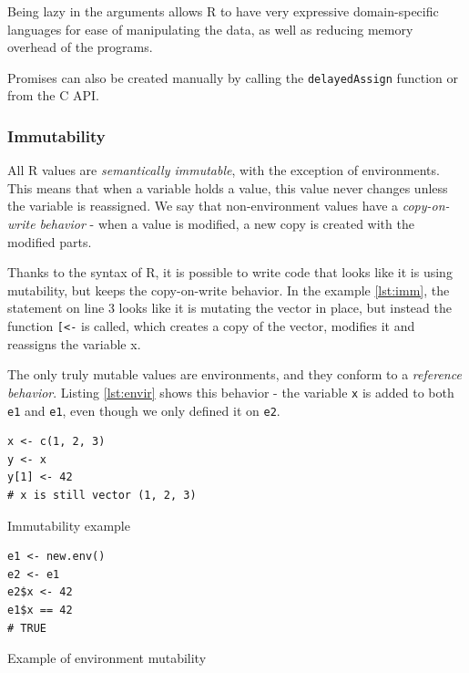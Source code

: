 Being lazy in the arguments allows R to have very expressive domain-specific languages for ease of manipulating the data, as well as reducing memory overhead of the programs.

Promises can also be created manually by calling the \texttt{delayedAssign} function or from the C API.

\subsubsection*{Immutability}

All R values are \textit{semantically immutable}, with the exception of environments. This means that when a variable holds a value, this value never changes unless the variable is reassigned. We say that non-environment values have a \textit{copy-on-write behavior} - when a value is modified, a new copy is created with the modified parts.

Thanks to the syntax of R, it is possible to write code that looks like it is using mutability, but keeps the copy-on-write behavior. In the example \ref{lst:imm}, the statement on line 3 looks like it is mutating the vector in place, but instead the function \texttt{[<-} is called, which creates a copy of the vector, modifies it and reassigns the variable x.

The only truly mutable values are environments, and they conform to a \textit{reference behavior}. Listing \ref{lst:envir} shows this behavior - the variable \texttt{x} is added to both \texttt{e1} and \texttt{e1}, even though we only defined it on \texttt{e2}.

\begin{listing}
	\centering
	\begin{minipage}{0.47\textwidth}
		\begin{verbatim}
x <- c(1, 2, 3)
y <- x
y[1] <- 42
# x is still vector (1, 2, 3)
      \end{verbatim}
		\caption{Immutability example}\label{lst:imm}
	\end{minipage}
	\hfill
	\begin{minipage}{0.47\textwidth}
		\begin{verbatim}
e1 <- new.env()
e2 <- e1
e2$x <- 42
e1$x == 42
# TRUE
      \end{verbatim}
		\caption{Example of environment mutability}\label{lst:envir}
	\end{minipage}
\end{listing}

